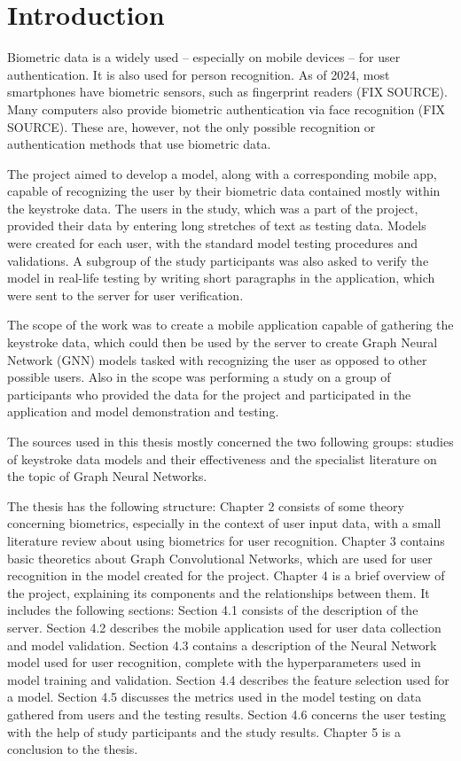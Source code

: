 
\chapter{Introduction}

Biometric data is a widely used -- especially on mobile devices -- for user authentication. It is also used for person recognition. As of 2024, most smartphones have biometric sensors, such as fingerprint readers (FIX SOURCE). Many computers also provide biometric authentication via face recognition (FIX SOURCE). These are, however, not the only possible recognition or authentication methods that use biometric data.

The project aimed to develop a model, along with a corresponding mobile app, capable of recognizing the user by their biometric data contained mostly within the keystroke data. The users in the study, which was a part of the project, provided their data by entering long stretches of text as testing data. Models were created for each user, with the standard model testing procedures and validations. A subgroup of the study participants was also asked to verify the model in real-life testing by writing short paragraphs in the application, which were sent to the server for user verification.

The scope of the work was to create a mobile application capable of gathering the keystroke data, which could then be used by the server to create Graph Neural Network (GNN) models tasked with recognizing the user as opposed to other possible users. Also in the scope was performing a study on a group of participants who provided the data for the project and participated in the application and model demonstration and testing.

The sources used in this thesis mostly concerned the two following groups: studies of keystroke data models and their effectiveness and the specialist literature on the topic of Graph Neural Networks.

The thesis has the following structure:
Chapter 2 consists of some theory concerning biometrics, especially in the context of user input data, with a small literature review about using biometrics for user recognition.
Chapter 3 contains basic theoretics about Graph Convolutional Networks, which are used for user recognition in the model created for the project.
Chapter 4 is a brief overview of the project, explaining its components and the relationships between them. It includes the following sections:
Section 4.1 consists of the description of the server.
Section 4.2 describes the mobile application used for user data collection and model validation.
Section 4.3 contains a description of the Neural Network model used for user recognition, complete with the hyperparameters used in model training and validation.
Section 4.4 describes the feature selection used for a model.
Section 4.5 discusses the metrics used in the model testing on data gathered from users and the testing results.
Section 4.6 concerns the user testing with the help of study participants and the study results.
Chapter 5 is a conclusion to the thesis.

